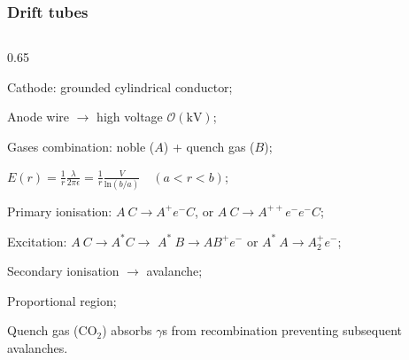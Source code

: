 \documentclass{beamer}
\begin{document}
\begin{frame}
    \frametitle{Drift tubes}
    \vspace{-4mm}
    \begin{columns}
        \begin{column}{0.65\framewidth}
            \setlength{\leftmargini}{1.1em}
            \begin{itemize}
               {\small \item Cathode: grounded cylindrical conductor;
               \vspace{1.2mm}
               \item Anode wire $\rightarrow$ high voltage $\mathcal{O}(\text{kV})$; 
                \vspace{1.2mm}
                \item Gases combination: noble ($A$) + quench gas ($B$);
                \vspace{1.2mm}
                \item $E(r)=\frac{1}{r}\frac{\lambda}{2\pi \epsilon}=\frac{1}{r}\frac{V}{ \text{ln}(b/a)} \quad (a<r<b)$;
                \vspace{1.2mm}
                \item Primary ionisation: $A \ C \rightarrow A^+ e^- C$, or $A \ C \rightarrow A^{++} e^- e^- C$;
                \vspace{1.2mm}
                \item Excitation: $A \ C \rightarrow A^* C \rightarrow$ $A^* \ B \rightarrow A B^+ e^-$ or $A^* \ A \rightarrow A_2^+ e^-$;
                \vspace{1.2mm}
                \item Secondary ionisation $\rightarrow$ avalanche;
                \vspace{1.2mm}
                \item Proportional region;
                \vspace{1.2mm}
                \item Quench gas (CO$_2$) absorbs $\gamma$s from recombination preventing subsequent 
                avalanches.
                
}
\end{itemize}
\end{column}
\end{columns}
\end{frame}
\end{document}
